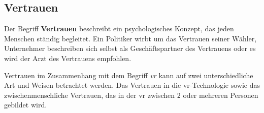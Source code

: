 \documentclass[a4paper,11pt]{article}%
\renewcommand{\\}{\vspace*{0.5\baselineskip} \newline}
\begin{document}
\newpage

	\subsection{Vertrauen}
	\label{Vertrauen}
Der Begriff \textbf{Vertrauen} beschreibt ein psychologisches Konzept, das jeden Menschen ständig begleitet.
Ein Politiker wirbt um das Vertrauen seiner Wähler, Unternehmer beschreiben sich selbst als Geschäftspartner des Vertrauens oder es wird der \glqq{}Arzt des Vertrauens\dq{} empfohlen.

Vertrauen im Zusammenhang mit dem Begriff \textit{\ac{vr}} kann auf zwei unterschiedliche Art und Weisen betrachtet werden. Das Vertrauen in die \ac{vr}-Technologie sowie das zwischenmenschliche Vertrauen, das in der \ac{vr} zwischen 2 oder mehreren Personen gebildet wird.
\end{document}
